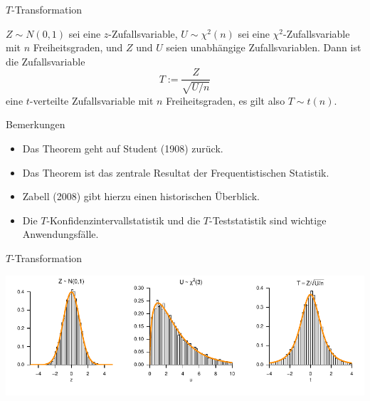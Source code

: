 \documentclass[
  8pt,
  ignorenonframetext,
]{beamer}
\providecommand{\tightlist}{%
  \setlength{\itemsep}{0pt}\setlength{\parskip}{0pt}}
\begin{document}
\begin{frame}{\(T\)-Transformation}
\protect\hypertarget{t-transformation-2}{}
\small
\begin{theorem}[$T$-Transformation]
\justifying
\normalfont
$Z \sim N(0,1)$ sei eine  $z$-Zufallsvariable, $U \sim \chi^2(n)$ sei eine
$\chi^2$-Zufallsvariable mit  $n$ Freiheitsgraden, und $Z$ und $U$ seien
unabhängige Zufallsvariablen. Dann ist die Zufallsvariable
\begin{equation}
T := \frac{Z}{\sqrt{U/n}}
\end{equation}
eine $t$-verteilte Zufallsvariable mit $n$ Freiheitsgraden, es gilt also $T \sim t(n)$.
\end{theorem}

\footnotesize

Bemerkungen

\begin{itemize}
\tightlist
\item
  Das Theorem geht auf Student (1908) zurück.
\item
  Das Theorem ist das zentrale Resultat der Frequentistischen Statistik.
\item
  Zabell (2008) gibt hierzu einen historischen Überblick.
\item
  Die \(T\)-Konfidenzintervallstatistik und die \(T\)-Teststatistik sind
  wichtige Anwendungsfälle.
\end{itemize}
\end{frame}

\begin{frame}{\(T\)-Transformation}
\protect\hypertarget{t-transformation-3}{}
\vfill
\vspace{3mm}

\begin{center}\includegraphics[width=1\linewidth]{8_Abbildungen/wtfi_8_t_transform} \end{center}
\vfill
\end{frame}
\end{document}
